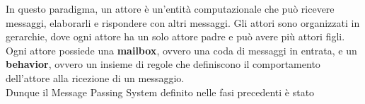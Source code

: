 In questo paradigma, un attore è un'entità computazionale che può ricevere messaggi, elaborarli e rispondere con altri messaggi. Gli attori sono organizzati in gerarchie, dove ogni attore ha un solo attore padre e può avere più attori figli.\\
Ogni attore possiede una \textbf{mailbox}, ovvero una coda di messaggi in entrata, e un \textbf{behavior}, ovvero un insieme di regole che definiscono il comportamento dell'attore alla ricezione di un messaggio.\\

Dunque il Message Passing System definito nelle fasi precedenti è stato









\newpage